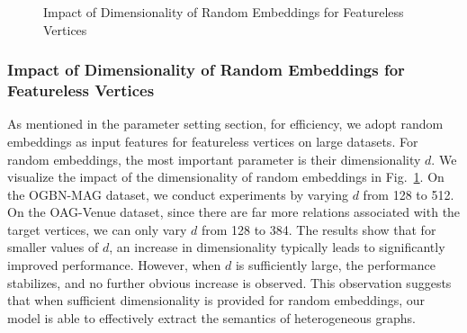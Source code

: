 \documentclass[lettersize,journal]{IEEEtran}
\begin{document}
\begin{figure}[!tp]
\vspace{-5mm}
\centering
{}
\caption{
  Impact of Dimensionality of Random Embeddings for Featureless Vertices
}
\label{fig:impact_dimension} \end{figure}












\subsubsection{Impact of Dimensionality of Random Embeddings for Featureless Vertices}


As mentioned in the parameter setting section, for efficiency, we adopt random embeddings as input features for featureless vertices on large datasets.
For random embeddings, the most important parameter is their dimensionality $d$.
We visualize the impact of the dimensionality of random embeddings in Fig.~\ref{fig:impact_dimension}.
On the OGBN-MAG dataset, we conduct experiments by varying $d$ from 128 to 512.
On the OAG-Venue dataset, since there are far more relations associated with the target vertices, we can only vary $d$ from 128 to 384.
The results show that for smaller values of $d$, an increase in dimensionality typically leads to significantly improved performance.
However, when $d$ is sufficiently large, the performance stabilizes, and no further obvious increase is observed.
This observation suggests that when sufficient dimensionality is provided for random embeddings, our model is able to effectively extract the semantics of heterogeneous graphs.
\end{document}
